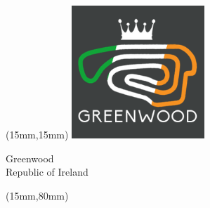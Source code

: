 \begin{textblock*}{50mm}(15mm,15mm)%
\includegraphics[width=50mm]{LG/GRWO.png}
\par Greenwood\\ Republic of Ireland
\end{textblock*}
\begin{textblock*}{185mm}(15mm,80mm)%
\end{textblock*}
